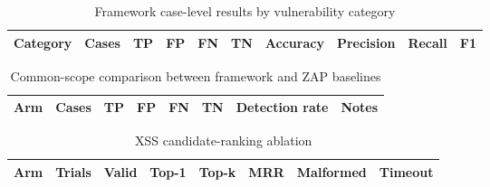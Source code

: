 
\begin{table}[htbp]
\centering
\caption{Framework case-level results by vulnerability category}
\label{tab:v13-framework-results}
\begin{tabular}{lrrrrrrrrr}
\hline
Category & Cases & TP & FP & FN & TN & Accuracy & Precision & Recall & F1 \\
\hline
\hline
\end{tabular}
\end{table}

\begin{table}[htbp]
\centering
\caption{Common-scope comparison between framework and ZAP baselines}
\label{tab:v13-common-scope}
\begin{tabular}{lrrrrrrl}
\hline
Arm & Cases & TP & FP & FN & TN & Detection rate & Notes \\
\hline
\hline
\end{tabular}
\end{table}

\begin{table}[htbp]
\centering
\caption{XSS candidate-ranking ablation}
\label{tab:v13-xss-ranking}
\begin{tabular}{lrrrrrrr}
\hline
Arm & Trials & Valid & Top-1 & Top-k & MRR & Malformed & Timeout \\
\hline
\hline
\end{tabular}
\end{table}
